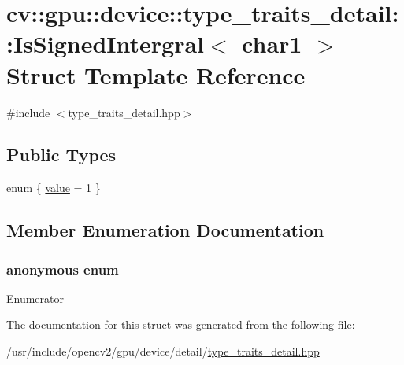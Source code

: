 \hypertarget{structcv_1_1gpu_1_1device_1_1type__traits__detail_1_1IsSignedIntergral_3_01char1_01_4}{\section{cv\-:\-:gpu\-:\-:device\-:\-:type\-\_\-traits\-\_\-detail\-:\-:Is\-Signed\-Intergral$<$ char1 $>$ Struct Template Reference}
\label{structcv_1_1gpu_1_1device_1_1type__traits__detail_1_1IsSignedIntergral_3_01char1_01_4}
}


{\ttfamily \#include $<$type\-\_\-traits\-\_\-detail.\-hpp$>$}

\subsection*{Public Types}
\begin{DoxyCompactItemize}
\item 
enum \{ \hyperlink{structcv_1_1gpu_1_1device_1_1type__traits__detail_1_1IsSignedIntergral_3_01char1_01_4_a3d0c32fe2a6ce54f54124163ee41c082a373c1377038a69965a9510596414af34}{value} = 1
 \}
\end{DoxyCompactItemize}


\subsection{Member Enumeration Documentation}
\hypertarget{structcv_1_1gpu_1_1device_1_1type__traits__detail_1_1IsSignedIntergral_3_01char1_01_4_a3d0c32fe2a6ce54f54124163ee41c082}{\subsubsection[{anonymous enum}]{\setlength{\rightskip}{0pt plus 5cm}anonymous enum}}\label{structcv_1_1gpu_1_1device_1_1type__traits__detail_1_1IsSignedIntergral_3_01char1_01_4_a3d0c32fe2a6ce54f54124163ee41c082}
\begin{Desc}
\item[Enumerator]\par
\begin{description}
\item[{\em 
\hypertarget{structcv_1_1gpu_1_1device_1_1type__traits__detail_1_1IsSignedIntergral_3_01char1_01_4_a3d0c32fe2a6ce54f54124163ee41c082a373c1377038a69965a9510596414af34}{value}\label{structcv_1_1gpu_1_1device_1_1type__traits__detail_1_1IsSignedIntergral_3_01char1_01_4_a3d0c32fe2a6ce54f54124163ee41c082a373c1377038a69965a9510596414af34}
}]\end{description}
\end{Desc}


The documentation for this struct was generated from the following file\-:\begin{DoxyCompactItemize}
\item 
/usr/include/opencv2/gpu/device/detail/\hyperlink{type__traits__detail_8hpp}{type\-\_\-traits\-\_\-detail.\-hpp}\end{DoxyCompactItemize}
